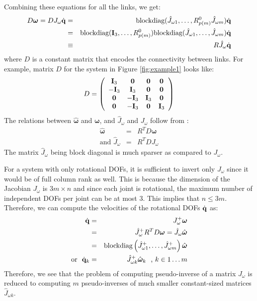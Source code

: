 Combining these equations for all the links, we get:
\begin{eqnarray}
\label{eq:jacsplit}
\nonumber
D \bm{\omega} = D J_{\omega} \dot{\mathbf{q}} & = & \mbox{blockdiag}(\hat{J}_{\omega 1},\hdots,R^0_{p(m)}\hat{J}_{\omega m})\dot{\mathbf{q}}\\
\nonumber
& = & \mbox{blockdiag}(\mathbf{I}_3,\hdots,R^0_{p(m)})\mbox{blockdiag}(\hat{J}_{\omega 1},\hdots,\hat{J}_{\omega m})\dot{\mathbf{q}}\\
& \equiv & R \hat{J}_{\omega}\dot{\mathbf{q}}
\end{eqnarray}
where $D$ is a constant matrix that encodes the connectivity between links. For example, matrix $D$ for the system in Figure \ref{fig:example1} looks
like:
\begin{equation}
D =
\left (
\begin{array}{cccc}
\mathbf{I}_{3}  & \mathbf{0} & \mathbf{0} & \mathbf{0}\\
-\mathbf{I}_{3} & \mathbf{I}_{3}  & \mathbf{0} & \mathbf{0}\\
\mathbf{0} & -\mathbf{I}_{3} & \mathbf{I}_{3}  & \mathbf{0}\\
\mathbf{0} & -\mathbf{I}_{3} & \mathbf{0} & \mathbf{I}_{3}\\
\end{array}
\right )  
\end{equation}
The relations between $\hat{\bm{\omega}}$ and $\bm{\omega}$, and $\hat{J}_{\omega}$ and $J_{\omega}$ follow from :
\begin{eqnarray}
\label{eq:jacbodyhat}
\nonumber
\hat{\bm{\omega}} & = &R^T D \bm{\omega}\\
\mbox{and } \hat{J}_{\omega} & = & R^T D J_{\omega}
\end{eqnarray}
The matrix $\hat{J}_{\omega}$ being block diagonal is much sparser as compared to ${J}_{\omega}$. 

For a system with only rotational DOFs, it is sufficient to invert only $J_{\omega}$ since it would be of full column rank as well. This is because the dimension of the Jacobian $J_{\omega}$ is $3m\times n$ and since each joint is rotational, the maximum number of independent DOFs per joint can be at most 3. This implies that $n\leq 3m$. Therefore, we can compute the velocities of the rotational DOFs $\dot{\mathbf{q}}$ as:
\begin{eqnarray}
\label{eq:angvel_cart2gen}
\nonumber
 \dot{\mathbf{q}} & = & J_{\omega}^+ \bm{\omega}\\
 \nonumber
 & = &  \hat{J}_{\omega}^+ R^T D\bm{\omega} = \hat{J}_{\omega} \hat{\bm{\omega}} \\
\nonumber
& = & \mbox{blockdiag}\left(\hat{J}_{\omega 1}^+,\hdots,\hat{J}_{\omega m}^+\right ) \hat{\bm{\omega}}\\
\mbox{or\ \ } \dot{\mathbf{q}}_k & = & \hat{J}_{\omega k}^+ \hat{\bm{\omega}}_k \mbox{\ \ , } k \in 1\hdots m
\end{eqnarray}
Therefore, we see that the problem of computing pseudo-inverse of a matrix $J_{\omega}$ is reduced to computing $m$ pseudo-inverses of much smaller constant-sized matrices $\hat{J}_{\omega k}$. 

